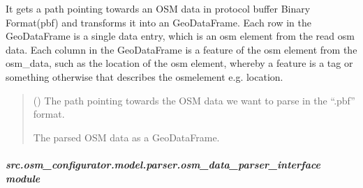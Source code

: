 \documentclass[letterpaper,10pt,english]{sphinxmanual}
\begin{document}
\begin{fulllineitems}
\begin{fulllineitems}
\label{\detokenize{apidoc/src.osm_configurator.model.parser:src.osm_configurator.model.parser.osm_data_parser.CategoryParser.parse_osm_data_file}}
\pysigstartsignatures
{}
\pysigstopsignatures
\sphinxAtStartPar
It gets a path pointing towards an OSM data in protocol buffer Binary Format(pbf) and transforms it into an
GeoDataFrame.
Each row in the GeoDataFrame is a single data entry, which is an osm element from the read osm data.
Each column in the GeoDataFrame is a feature of the osm element from the osm\_data, such as the location of the
osm element, whereby a feature is a tag or something otherwise that describes the osm\sphinxhyphen{}element e.g. location.
\begin{quote}\begin{description}
\sphinxAtStartPar
{} () \textendash{} The path pointing towards the OSM data we want to parse in the “.pbf” format.

\sphinxAtStartPar
The parsed OSM data as a GeoDataFrame.

\sphinxAtStartPar
{}

\end{description}\end{quote}

\end{fulllineitems}


\end{fulllineitems}



\subparagraph{src.osm\_configurator.model.parser.osm\_data\_parser\_interface module}
\label{\detokenize{apidoc/src.osm_configurator.model.parser:module-src.osm_configurator.model.parser.osm_data_parser_interface}}\label{\detokenize{apidoc/src.osm_configurator.model.parser:src-osm-configurator-model-parser-osm-data-parser-interface-module}}
\end{document}
